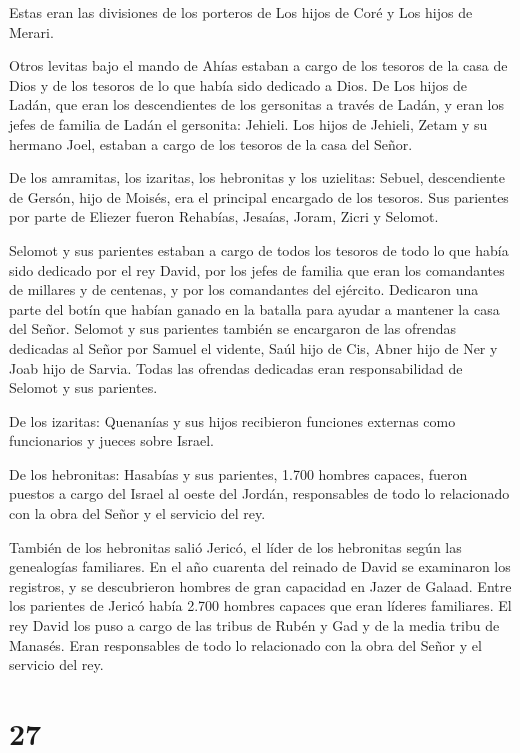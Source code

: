  Estas eran las divisiones de los porteros de Los hijos de
Coré y Los hijos de Merari.

 Otros levitas bajo el mando de Ahías estaban a cargo de
los tesoros de la casa de Dios y de los tesoros de lo que había sido
dedicado a Dios.  De Los hijos de Ladán, que eran los
descendientes de los gersonitas a través de Ladán, y eran los jefes de
familia de Ladán el gersonita: Jehieli.  Los hijos de
Jehieli, Zetam y su hermano Joel, estaban a cargo de los tesoros de la
casa del Señor.

 De los amramitas, los izaritas, los hebronitas y los
uzielitas:  Sebuel, descendiente de Gersón, hijo de Moisés,
era el principal encargado de los tesoros.  Sus parientes
por parte de Eliezer fueron Rehabías, Jesaías, Joram, Zicri y Selomot.

 Selomot y sus parientes estaban a cargo de todos los
tesoros de todo lo que había sido dedicado por el rey David, por los
jefes de familia que eran los comandantes de millares y de centenas, y
por los comandantes del ejército.  Dedicaron una parte del
botín que habían ganado en la batalla para ayudar a mantener la casa del
Señor.  Selomot y sus parientes también se encargaron de
las ofrendas dedicadas al Señor por Samuel el vidente, Saúl hijo de Cis,
Abner hijo de Ner y Joab hijo de Sarvia. Todas las ofrendas dedicadas
eran responsabilidad de Selomot y sus parientes.

 De los izaritas: Quenanías y sus hijos recibieron
funciones externas como funcionarios y jueces sobre Israel.

 De los hebronitas: Hasabías y sus parientes, 1.700 hombres
capaces, fueron puestos a cargo del Israel al oeste del Jordán,
responsables de todo lo relacionado con la obra del Señor y el servicio
del rey.

 También de los hebronitas salió Jericó, el líder de los
hebronitas según las genealogías familiares. En el año cuarenta del
reinado de David se examinaron los registros, y se descubrieron hombres
de gran capacidad en Jazer de Galaad.  Entre los parientes
de Jericó había 2.700 hombres capaces que eran líderes familiares. El
rey David los puso a cargo de las tribus de Rubén y Gad y de la media
tribu de Manasés. Eran responsables de todo lo relacionado con la obra
del Señor y el servicio del rey.

\hypertarget{section-26}{%
\section{27}\label{section-26}}

